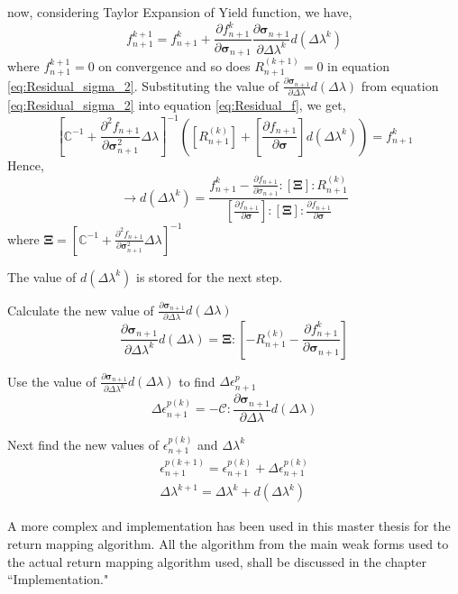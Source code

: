 \begin{steps}
 	now, considering Taylor Expansion of Yield  function, we have,
 	\begin{equation}
 		f^{k+1}_{n+1}=f^{k}_{n+1}+ \frac{\partial f^{k}_{n+1}}{\partial \bm \sigma_{n+1}} \frac{\partial \bm \sigma_{n+1}}{\partial \Delta  \lambda^k}d( \Delta  \lambda^k)
 		\label{eq:Residual_f}
 	\end{equation}
 	where $f^{k+1}_{n+1}=0$ on convergence and so does $R^{(k+1)}_{n+1}=0$ in equation \ref{eq:Residual_sigma_2}.
 	Substituting the value of $ \frac{\partial \bm \sigma_{n+1}}{\partial \Delta \lambda}d( \Delta  \lambda)$ from equation \ref{eq:Residual_sigma_2} into equation \ref{eq:Residual_f}, we get,
 	\begin{equation}
 	\left[ \mathbb{C}^{-1}+\frac{\partial^2 f_{n+1}}{\partial \bm\sigma^2_{n+1}}\Delta \lambda \right]^{-1} \left( \left[R^{(k)}_{n+1}\right] + \left[\frac{\partial f_{n+1}}{\partial \bm\sigma}\right]d(\Delta \lambda^k)\right)=f^k_{n+1}
 	\end{equation}
 	Hence,
 	\begin{equation}
 	\rightarrow d(\Delta \lambda^k) =\frac{f^k_{n+1}-\frac{\partial f_{n+1}}{\partial \sigma_{n+1}}:\left[\bm\Xi\right]:R^{(k)}_{n+1}}{\left[\frac{\partial f_{n+1}}{\partial \bm\sigma}\right]:\left[\bm\Xi\right]:\frac{\partial f_{n+1}}{\partial \bm \sigma}}
 	\end{equation}
 	where $\bm\Xi =\left[ \mathbb{C}^{-1}+\frac{\partial^2 f_{n+1}}{\partial \bm\sigma^2_{n+1}}\Delta \lambda \right]^{-1}$
 	
 	The value of $d(\Delta \lambda^k)$ is stored for the next step.
 	\item Calculate the new value of $ \frac{\partial \bm \sigma_{n+1}}{\partial \Delta \lambda}d( \Delta  \lambda)$ \
 	\begin{equation}
 	 \frac{\partial \bm \sigma_{n+1}}{\partial \Delta \lambda^k}d( \Delta  \lambda)=\bm\Xi:\left[ -R^{(k)}_{n+1}-\frac{\partial f^{k}_{n+1}}{\partial \bm \sigma_{n+1}}\right]
 	\end{equation}
 	\item Use the value of $\frac{\partial \bm \sigma_{n+1}}{\partial \Delta \lambda^k}d( \Delta  \lambda)$ to find $\Delta \epsilon^p_{n+1}$
 	\begin{equation}
 	\Delta \epsilon^{p(k)}_{n+1}=-\mathcal{C}:\frac{\partial \bm \sigma_{n+1}}{\partial \Delta \lambda}d( \Delta  \lambda)
 	\end{equation}
 	\item Next find the new values of $\epsilon^{p(k)}_{n+1}$ and $\Delta \lambda^{k}$
 	\begin{eqnarray}
 	\epsilon^{p(k+1)}_{n+1} = \epsilon^{p(k)}_{n+1}+ \Delta \epsilon^{p(k)}_{n+1}\\
 	\Delta \lambda^{k+1}=\Delta \lambda^{k}+d( \Delta  \lambda^k)
 	\end{eqnarray}
 \end{steps}

A more complex and implementation has been used in this master thesis for the return mapping algorithm. All the algorithm from the main weak forms used to the actual return mapping algorithm used, shall be discussed in the chapter ``Implementation."
 
 
 
 